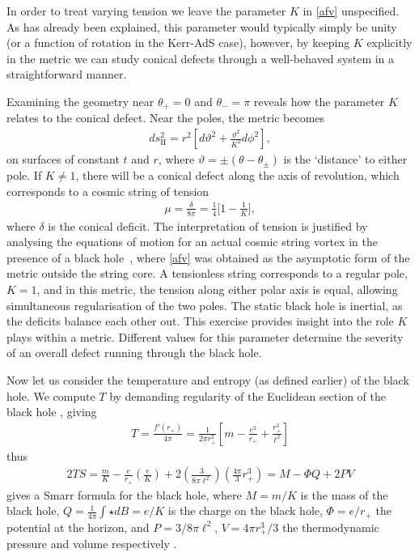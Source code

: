 \documentclass[
twoside,
openright,
frontopenright,
]{dmathesis}
\begin{document}
In order to treat varying tension we leave the parameter $K$ in \cref{afv}
unspecified. As has already been explained, this parameter would typically
simply be unity (or a function of rotation in the Kerr-AdS case), however, by
keeping $K$ explicitly in the metric we can study conical defects through a
well-behaved system in a straightforward manner.

Examining the geometry near $\theta_+ = 0$ and $\theta_- = \pi$ reveals how the
parameter $K$ relates to the conical defect. Near the poles, the metric becomes
\begin{align}
ds_{\mathrm{II}}^2 = r^2 \left[ d\vartheta^2 + \frac{\vartheta^2}{K^2} d\phi^2\right],
\end{align}
on surfaces of constant $t$ and $r$, where
$\vartheta = \pm (\theta - \theta_\pm)$ is the `distance' to either pole. If
$K\neq 1$, there will be a conical defect along the axis of revolution, which
corresponds to a cosmic string of tension
\begin{align}
\mu = \frac{\delta}{8\pi} = \frac14 \bigg[1-\frac{1}{K}\bigg],
\label{afvtension}
\end{align}
where $\delta$ is the conical deficit. The interpretation of tension is
justified by analysing the equations of motion for an actual cosmic string
vortex in the presence of a black hole~\cite{Achucarro:1995nu}, where
\eqref{afv} was obtained as the asymptotic form of the metric outside the string
core.  A tensionless string corresponds to a regular pole, $K=1$, and in this
metric, the tension along either polar axis is equal, allowing simultaneous
regularisation of the two poles. The static black hole is inertial, as the
deficits balance each other out. This exercise provides insight into the role
$K$ plays within a metric. Different values for this parameter determine the
severity of an overall defect running through the black hole.

Now let us consider the temperature and entropy (as defined earlier) of the
black hole. We compute $T$ by demanding regularity of the Euclidean section of
the black hole \cite{Gibbons:1976ue}, giving
\begin{align}
T = \frac{f'(r_+)}{4\pi} = \frac{1}{2\pi r_+^2} \left [
m - \frac{e^2}{r_+} + \frac{r_+^3}{\ell^2}\right]
\end{align}
thus 
\begin{align}
2TS = \frac{m}{K} - \frac{e}{r_+}\left (\frac{e}{K} \right ) 
+ 2\left (\frac{3}{8\pi \ell^2} \right ) \left (\frac{4\pi}{3} r_+^3\right ) 
= M - \Phi Q + 2PV
\end{align}
gives a Smarr formula \cite{Smarr:1972kt} for the black hole, where $M=m/K$ is
the mass of the black hole, $Q = \frac{1}{4\pi}
\int \star dB=e/K$ is the charge on the black hole, 
$\Phi = e/r_+$ the potential at the horizon, and $P = 3/8\pi \ell^2$, 
$V = 4\pi r_+^3/3$ the thermodynamic pressure and volume respectively 
\cite{Teitelboim:1985dp,Kastor:2009wy,Dolan:2011xt}.
\end{document}
